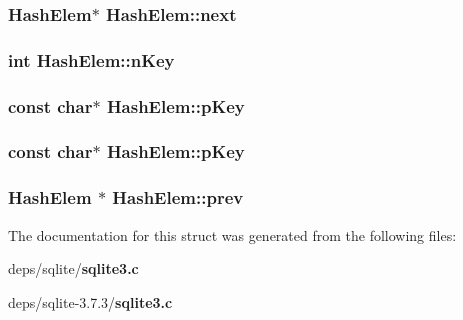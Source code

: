 \subsubsection{\setlength{\rightskip}{0pt plus 5cm}\bf{Hash\-Elem}$\ast$ \bf{Hash\-Elem::next}}\label{structHashElem_a528f2cc3194e444a06a642f7718dc6a}


\subsubsection{\setlength{\rightskip}{0pt plus 5cm}int \bf{Hash\-Elem::n\-Key}}\label{structHashElem_c0025d4fba103b3d1a56768a74f2b516}


\subsubsection{\setlength{\rightskip}{0pt plus 5cm}const char$\ast$ \bf{Hash\-Elem::p\-Key}}\label{structHashElem_d452d97a9aa654355c07496ad682c2db}


\subsubsection{\setlength{\rightskip}{0pt plus 5cm}const char$\ast$ \bf{Hash\-Elem::p\-Key}}\label{structHashElem_d452d97a9aa654355c07496ad682c2db}


\subsubsection{\setlength{\rightskip}{0pt plus 5cm}\bf{Hash\-Elem} $\ast$ \bf{Hash\-Elem::prev}}\label{structHashElem_c42a740093e543b29164dc7f51965e17}




The documentation for this struct was generated from the following files:\begin{CompactItemize}
\item 
deps/sqlite/\bf{sqlite3.c}\item 
deps/sqlite-3.7.3/\bf{sqlite3.c}\end{CompactItemize}
